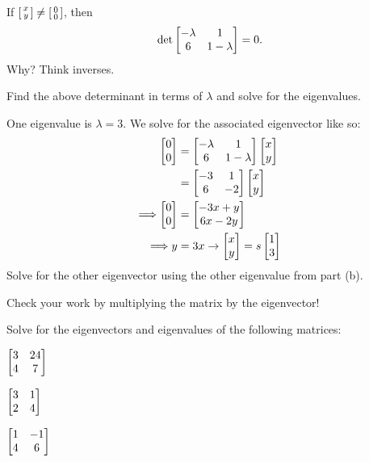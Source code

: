 \documentclass[../gatm_answers.tex]{subfiles}
\begin{document}
\begin{inner_problem}[start=1]
\item If $\left[\begin{smallmatrix} x \\ y \end{smallmatrix}\right]\neq \left[\begin{smallmatrix} 0 \\ 0 \end{smallmatrix}\right]$, then $$\det \begin{bmatrix} -\lambda & 1 \\ 6 & 1-\lambda \end{bmatrix}=0.$$ Why? Think inverses.
\end{inner_problem}

\begin{inner_problem}
\item Find the above determinant in terms of $\lambda$ and solve for the eigenvalues.
\end{inner_problem}

\begin{inner_problem}
\item One eigenvalue is $\lambda=3$. We solve for the associated eigenvector like so:
\begin{align*}
\begin{bmatrix} 0 \\ 0 \end{bmatrix} &= \begin{bmatrix} -\lambda & 1 \\ 6 & 1-\lambda \end{bmatrix}\begin{bmatrix} x \\ y \end{bmatrix} \\
&= \begin{bmatrix} -3 & 1 \\ 6 & -2 \end{bmatrix}\begin{bmatrix} x \\ y \end{bmatrix} \\
\Longrightarrow \begin{bmatrix} 0 \\ 0 \end{bmatrix} &= \begin{bmatrix} -3x+y \\ 6x-2y \end{bmatrix} \\
\Longrightarrow y&=3x \rightarrow \begin{bmatrix} x \\ y \end{bmatrix}=s\begin{bmatrix} 1 \\ 3 \end{bmatrix}
\end{align*}
Solve for the other eigenvector using the other eigenvalue from part (b).
\end{inner_problem}

\begin{inner_problem}
\item Check your work by multiplying the matrix by the eigenvector!
\end{inner_problem}

\begin{outer_problem}
\item Solve for the eigenvectors and eigenvalues of the following matrices:
\end{outer_problem}

\begin{inner_problem}[start=1]
\item $\begin{bmatrix} 3 & 24 \\ 4 & 7 \end{bmatrix}$
\end{inner_problem}

\begin{inner_problem}
\item $\begin{bmatrix} 3 & 1 \\ 2 & 4 \end{bmatrix}$
\end{inner_problem}

\begin{inner_problem}
\item $\begin{bmatrix} 1 & -1 \\ 4 & 6 \end{bmatrix}$
\end{inner_problem}
\end{document}
